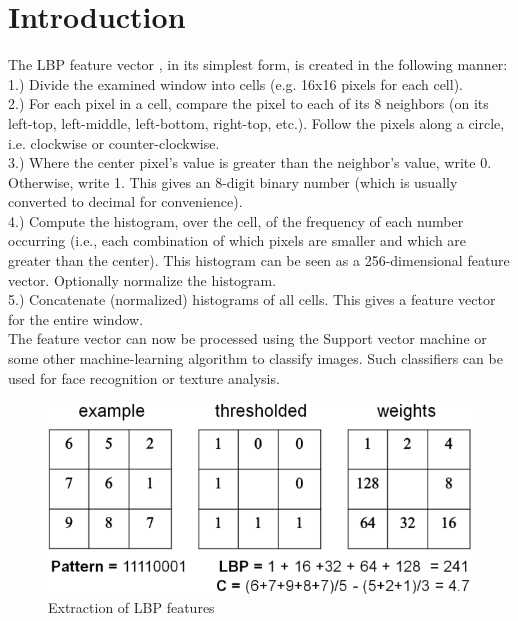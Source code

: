 \documentclass[preprint,12pt]{elsarticle}
\begin{document}

\section{Introduction}
\label{S:1}

The LBP feature vector \cite{ojala2002multiresolution}, in its simplest form, is created in the following manner:\\

1.) Divide the examined window into cells (e.g. 16x16 pixels for each cell).\\
 
2.) For each pixel in a cell, compare the pixel to each 
of its 8 neighbors (on its left-top, left-middle, left-bottom, right-top, etc.). Follow the pixels along a circle, i.e. clockwise or counter-clockwise.\\

3.) Where the center pixel's value is greater than the neighbor's value, write 0. Otherwise, write 1. This gives an 8-digit binary number (which is usually converted to decimal for convenience).\\

4.) Compute the histogram, over the cell, of the frequency of each number occurring (i.e., each combination of which pixels are smaller and which are greater than the center). This histogram can be seen as a 256-dimensional feature vector.
Optionally normalize the histogram.\\

5.) Concatenate (normalized) histograms of all cells. This gives a feature vector for the entire window.\\

The feature vector can now be processed using the Support vector machine or some other machine-learning algorithm to classify images. Such classifiers can be used for face recognition or texture analysis.\\


\begin{figure}[h]
\centering\includegraphics[width=0.8\linewidth]{image004}
\caption{Extraction of LBP features}
\end{figure}
\end{document}
